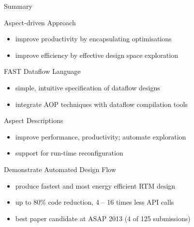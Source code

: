 \begin{frame}{Summary}

  \begin{beamerboxesrounded}{Aspect-driven Approach}
    \begin{itemize}
    \item improve productivity by encapsulating optimisations
    \item improve efficiency by effective design space exploration
    \end{itemize}
  \end{beamerboxesrounded}

  \begin{beamerboxesrounded}{FAST Dataflow Language}
    \begin{itemize}
    \item simple, intuitive specification of dataflow designs
    \item integrate AOP techniques with dataflow compilation tools
    \end{itemize}
  \end{beamerboxesrounded}

  \begin{beamerboxesrounded}{Aspect Descriptions}
    \begin{itemize}
      \item improve performance, productivity; automate exploration
      \item support for run-time reconfiguration
    \end{itemize}
  \end{beamerboxesrounded}

  \begin{beamerboxesrounded}{Demonstrate Automated Design Flow}
    \begin{itemize}
    \item produce fastest and most energy efficient RTM design
    \item up to 80\% code reduction, 4 -- 16 times less API calls
    \item best paper candidate at ASAP 2013 (4 of 125 submissions)
    \end{itemize}
  \end{beamerboxesrounded}

\end{frame}
